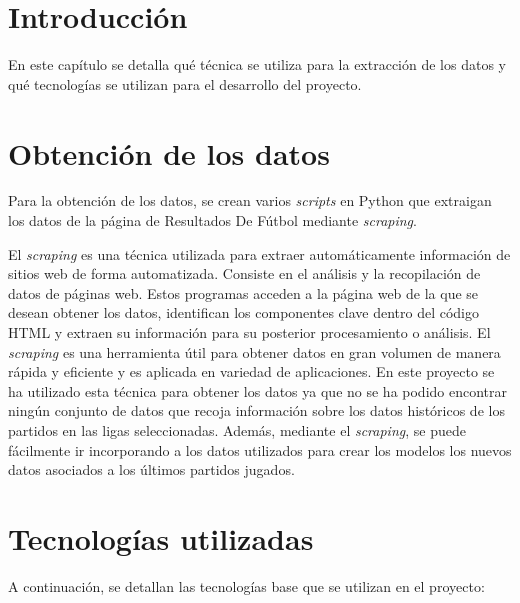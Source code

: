 
\section{Introducción}
En este capítulo se detalla qué técnica se utiliza para la extracción de los datos y qué tecnologías se utilizan para el desarrollo del proyecto. 






\section{Obtención de los datos}
Para la obtención de los datos, se crean varios \textit{scripts} en Python que extraigan los datos de la página de Resultados De Fútbol \cite{resultadosfutbol} mediante \textit{scraping}.

El \textit{scraping} \cite{scraping} es una técnica utilizada para extraer automáticamente información de sitios web de forma automatizada. Consiste en el análisis y la recopilación de datos de páginas web. Estos programas acceden a la página web de la que se desean obtener los datos, identifican los componentes clave dentro del código HTML y extraen su información para su posterior procesamiento o análisis. El \textit{scraping} es una herramienta útil para obtener datos en gran volumen de manera rápida y eficiente y es aplicada en variedad de aplicaciones. En este proyecto se ha utilizado esta técnica para obtener los datos ya que no se ha podido encontrar ningún conjunto de datos que recoja información sobre los datos históricos de los partidos en las ligas seleccionadas. Además, mediante el \textit{scraping}, se puede fácilmente ir incorporando a los datos utilizados para crear los modelos los nuevos datos asociados a los últimos partidos jugados.





\section{Tecnologías utilizadas}

A continuación, se detallan las tecnologías base que se utilizan en el proyecto:


